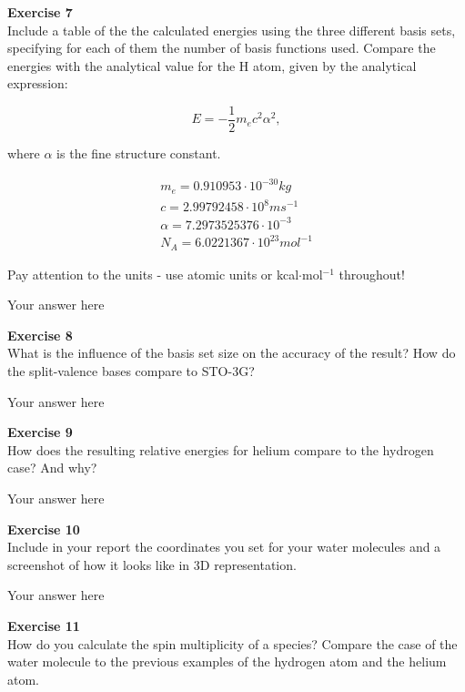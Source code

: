 \documentclass{article}
\begin{document}
\begin{mdframed}
\textbf{Exercise 7}\\
Include a table of the the calculated energies using the three different basis sets, specifying for each of them the number of basis functions used. Compare the energies with the analytical value for the H atom, given by the analytical expression:

\begin{equation}
E = -\frac{1}{2} m_e c^2\alpha^2,
\end{equation}

where $\alpha$ is the fine structure constant.

\begin{align}
m_e = 0.910953\cdot10^{-30} kg\\
c = 2.99792458\cdot10^8 m s^{-1}\\
\alpha = 7.2973525376\cdot10^{-3}\\
N_A = 6.0221367\cdot10^{23}mol^{-1}
\end{align}

Pay attention to the units - use atomic units or kcal$\cdot$mol$^{ -1}$ throughout!
\end{mdframed}

Your answer here

\begin{mdframed}
\textbf{Exercise 8}\\
What is the influence of the basis set size on the accuracy of the result? How do the split-valence bases compare to STO-3G?
\end{mdframed}

Your answer here

\begin{mdframed}
\textbf{Exercise 9}\\
How does the resulting relative energies for helium compare to the hydrogen case? And why?
\end{mdframed}

Your answer here

\begin{mdframed}
\textbf{Exercise 10}\\
Include in your report the coordinates you set for your water molecules and a screenshot of how it looks like in 3D representation.
\end{mdframed}

Your answer here

\begin{mdframed}
\textbf{Exercise 11}\\
How do you calculate the spin multiplicity of a species? Compare the case of the water molecule to the previous examples of the hydrogen atom and the helium atom.
\end{mdframed}
\end{document}
